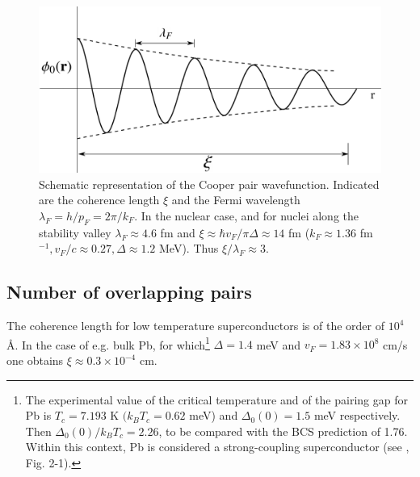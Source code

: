      
        

 \begin{figure}[h]
 	\centerline{\includegraphics*[width=12cm,angle=0	]{nutshell/figs/fig3B2}}
 	\caption{Schematic representation of the Cooper pair wavefunction. Indicated are the coherence length $\xi$ and the Fermi wavelength $\lambda_F=h/p_F=2\pi/k_F$. In the nuclear case, and for nuclei along the stability valley $\lambda_F\approx4.6$ fm and $\xi\approx \hbar v_F/\pi\Delta\approx14$ fm ($k_F\approx 1.36$ fm $^{-1}, v_F/c\approx0.27, \Delta\approx 1.2$ MeV). Thus $\xi/\lambda_F\approx 3$.}\label{fig3B2}
 \end{figure}
 





\subsection{Number of overlapping pairs}
 

The coherence length for low temperature superconductors is of the order of $10^4$\AA. In the case of e.g. bulk Pb, for which\footnote{\label{foot75}  The experimental value of the critical temperature and of the pairing gap for Pb is $T_c=7.193$ K $(k_BT_c=0.62$ meV) and $\Delta_0(0)=1.5$ meV respectively.  Then  $\Delta_0(0)/k_BT_c=2.26$, to be compared with the BCS prediction of 1.76. Within this context, Pb is considered a strong-coupling superconductor (see \cite{Tinkham:96}, Fig. 2-1).} $\Delta=1.4$ meV and $v_F=1.83\times10^8$ cm/s one obtains $\xi\approx0.3\times10^{-4}$ cm. 

